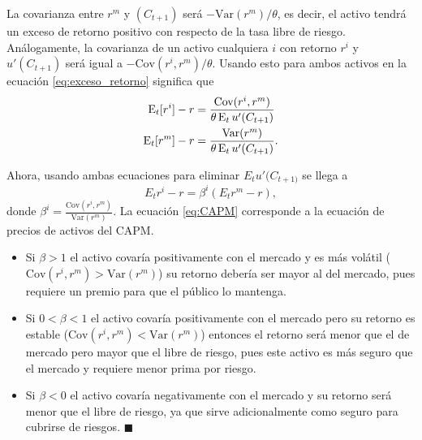 \documentclass[DeGregorioResumen]{subfiles}
\begin{document}
La covarianza entre $r^m$ y $(C_{t+1})$ será $-\text{Var}(r^m)/\theta$, es decir, el activo tendrá un exceso de retorno positivo con respecto de la tasa libre de riesgo. Análogamente, la covarianza de un activo cualquiera $i$ con retorno $r^i$ y $u'(C_{t+1})$ será igual a $-\text{Cov}(r^i, r^m)/\theta$. Usando esto para ambos activos en la ecuación \eqref{eq:exceso_retorno} significa que
\begin{align*}
\operatorname{E}_t[r^i]-r &= \frac{\text{Cov}(r^i, r^m)}{\theta \operatorname{E}_t u'(C_{t+1})} \\
\operatorname{E}_t[r^m]-r &= \frac{\text{Var}(r^m)}{\theta \operatorname{E}_t u'(C_{t+1})}.
\end{align*}

Ahora, usando ambas ecuaciones para eliminar $E_t u'(C_{t+1)}$ se llega a
\begin{equation}
E_t r^i - r = \beta^i(E_tr^m - r),
\label{eq:CAPM}
\end{equation}
donde $\beta^i = \frac{\text{Cov}(r^i, r^m)}{\text{Var}(r^m)} $. La ecuación \eqref{eq:CAPM} corresponde a la ecuación de precios de activos del CAPM.

\begin{itemize}
\item Si $\beta>1$ el activo covaría positivamente con el mercado y es más volátil ($\text{Cov}(r^i, r^m)>\text{Var}(r^m)$) su retorno debería ser mayor al del mercado, pues requiere un premio para que el público lo mantenga.
\item Si $0<\beta<1$ el activo covaría positivamente con el mercado pero su retorno es estable ($\text{Cov}(r^i, r^m)<\text{Var}(r^m)$) entonces el retorno será menor que el de mercado pero mayor que el libre de riesgo, pues este activo es más seguro que el mercado y requiere menor prima por riesgo.
\item Si $\beta<0$ el activo covaría negativamente con el mercado y su retorno será menor que el libre de riesgo, ya que sirve adicionalmente como seguro para cubrirse de riesgos. $\blacksquare$
\end{itemize}

\end{document}
